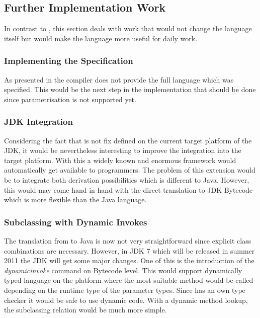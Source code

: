 
\subsection{Further Implementation Work}
In contrast to , this section deals with work that
would not change the language itself but would make the language more useful
for daily work.

\subsubsection{Implementing the Specification}
As presented in  the compiler does not provide the
full language which was specified. This would be the next step in the
implementation that should be done since parametrisation is not supported
yet.

\subsubsection{JDK Integration}
Considering the fact that \ooplss is not fix defined on the current
target platform of the JDK, it would be nevertheless interesting to
improve the integration into the target platform. With this a widely
known and enormous framework would automatically get available to
\ooplss programmers. The problem of this extension would be to integrate
both derivation possibilities which is different to Java. However,
this would may come hand in hand with the direct translation to JDK
Bytecode which is more flexible than the Java language.

\subsubsection{Subclassing with Dynamic Invokes}
The translation from \ooplss to Java is now not very straightforward since
explicit class combinations are necessary. However, in JDK 7 which will
be released in summer 2011 the JDK will get some major changes. One
of this is the introduction of the \emph{dynamicinvoke} command on
Bytecode level. This would support dynamically typed language on the
platform where the most suitable method would be called depending on the
runtime type of the parameter types. Since \ooplss has an own type
checker it would be safe to use dynamic code. With a dynamic method
lookup, the subclassing relation would be much more simple.

